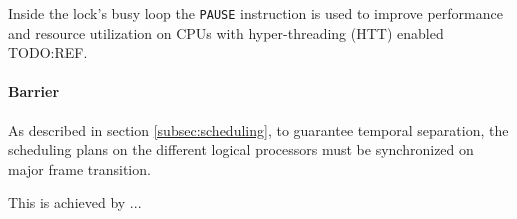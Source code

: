 Inside the lock's busy loop the \texttt{PAUSE} instruction is used to improve
performance and resource utilization on CPUs with hyper-threading
(HTT) enabled TODO:REF.

\paragraph{Barrier}
As described in section \ref{subsec:scheduling}, to guarantee temporal
separation, the scheduling plans on the different logical processors must be
synchronized on major frame transition.

This is achieved by ...





